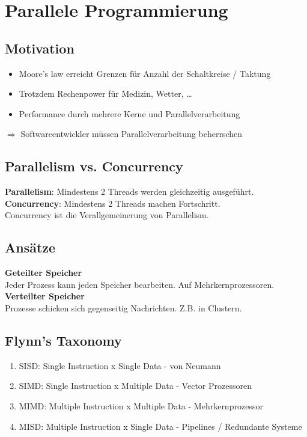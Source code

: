 

\section{Parallele Programmierung}

\subsection{Motivation}
\begin{itemize}
  \item Moore's law erreicht Grenzen für Anzahl der Schaltkreise / Taktung
  \item Trotzdem Rechenpower für Medizin, Wetter, \ldots
  \item Performance durch mehrere Kerne und Parallelverarbeitung
\end{itemize}
\(\Rightarrow\) Softwareentwickler müssen Parallelverarbeitung beherrschen

\subsection{Parallelism vs. Concurrency}
\textbf{Parallelism}: Mindestens 2 Threads werden gleichzeitig ausgeführt.\\
\textbf{Concurrency}: Mindestens 2 Threads machen Fortschritt.\\
Concurrency ist die Verallgemeinerung von Parallelism.

\subsection{Ansätze}
\textbf{Geteilter Speicher}\\
Jeder Prozess kann jeden Speicher bearbeiten. Auf Mehrkernprozessoren.\\
\textbf{Verteilter Speicher}\\
Prozesse schicken sich gegenseitig Nachrichten. Z.B. in Clustern.

\subsection{Flynn's Taxonomy}
\begin{enumerate}
  \item SISD: Single Instruction x Single Data - von Neumann
  \item SIMD: Single Instruction x Multiple Data - Vector Prozessoren
  \item MIMD: Multiple Instruction x Multiple Data - Mehrkernprozessor
  \item MISD: Multiple Instruction x Single Data - Pipelines / Redundante Systeme
\end{enumerate}

